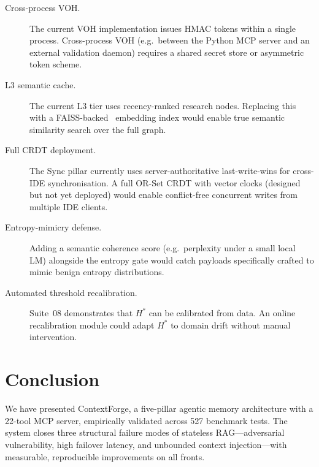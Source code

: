 \documentclass[11pt]{article}
\begin{document}
\begin{description}
  \item[Cross-process VOH.]
    The current VOH implementation issues HMAC tokens within a single process.
    Cross-process VOH (e.g.\ between the Python MCP server and an external
    validation daemon) requires a shared secret store or asymmetric
    token scheme.

  \item[L3 semantic cache.]
    The current L3 tier uses recency-ranked research nodes. Replacing this
    with a FAISS-backed~\cite{johnson2021faiss} embedding index would
    enable true semantic similarity search over the full graph.

  \item[Full CRDT deployment.]
    The Sync pillar currently uses server-authoritative last-write-wins for
    cross-IDE synchronisation. A full OR-Set CRDT with vector clocks
    (designed but not yet deployed) would enable conflict-free concurrent
    writes from multiple IDE clients.

  \item[Entropy-mimicry defense.]
    Adding a semantic coherence score (e.g.\ perplexity under a small local
    LM) alongside the entropy gate would catch payloads specifically crafted
    to mimic benign entropy distributions.

  \item[Automated threshold recalibration.]
    Suite~08 demonstrates that $H^{*}$ can be calibrated from data. An
    online recalibration module could adapt $H^{*}$ to domain drift without
    manual intervention.
\end{description}

\section{Conclusion}
\label{sec:conclusion}

We have presented ContextForge, a five-pillar agentic memory architecture
with a 22-tool MCP server, empirically validated across 527 benchmark tests.
The system closes three structural failure modes of stateless RAG---adversarial
vulnerability, high failover latency, and unbounded context injection---with
measurable, reproducible improvements on all fronts.
\end{document}
